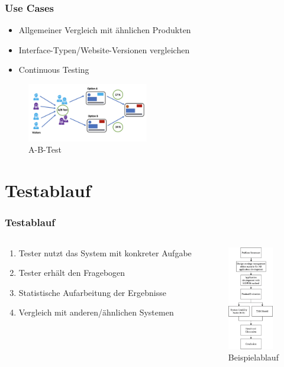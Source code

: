 \documentclass[12pt, aspectratio=169]{beamer}
\begin{document}
	
\begin{frame}
	\frametitle{Use Cases}
	\vspace{20px}
	\begin{itemize}
		\item<1> Allgemeiner Vergleich mit ähnlichen Produkten
		\item<1> Interface-Typen/Website-Versionen vergleichen
		\item<1> Continuous Testing
	\end{itemize}
	\vspace{15px}
	\begin{figure}
		\includegraphics[keepaspectratio=true, width=200px]{./image/ab.png}
		\caption{A-B-Test \tiny{\cite{pic2}}}
	\end{figure}
\end{frame}

\section{Testablauf}
\begin{frame}
	\frametitle{Testablauf}
	\begin{columns}
		\begin{column}{0.7\textwidth}
			\begin{enumerate}
				\item<1> Tester nutzt das System mit konkreter Aufgabe
				\item<1> Tester erhält den Fragebogen
				\item<1> Statistische Aufarbeitung der Ergebnisse
				\item<1> Vergleich mit anderen/ähnlichen Systemen
			\end{enumerate}
		\end{column}
		\begin{column}{0.3\textwidth}
			\begin{figure}
				\centering
				\includegraphics[keepaspectratio=true, width=75px]{./image/ablauf.png}
				\caption{Beispielablauf \tiny{\cite{young2009cultivating}}}
			\end{figure}		
		\end{column}
	\end{columns}
\end{frame}
\end{document}
